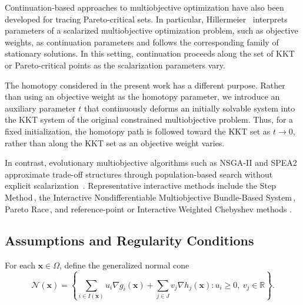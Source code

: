 \documentclass[11pt,pdflatex,sn-mathphys-ay]{sn-jnl}%
\theoremstyle{definition}
\theoremstyle{thmstyleone}%
\theoremstyle{thmstyletwo}%
\theoremstyle{thmstylethree}%
\newcommand{\add}[1]{\textcolor{revisionblue}{#1}}
\begin{document}
	\add{Continuation-based approaches to multiobjective optimization have also been developed for tracing Pareto-critical sets. In particular, Hillermeier~\cite{hillermeier2012nonlinear} interprets parameters of a scalarized multiobjective optimization problem, such as objective weights, as continuation parameters and follows the corresponding
		family of stationary solutions. In this setting, continuation proceeds
		along the set of KKT or Pareto-critical points as the scalarization
		parameters vary.}
	
	\add{The homotopy considered in the present work has a different purpose.
		Rather than using an objective weight as the homotopy parameter, we
		introduce an auxiliary parameter $t$ that continuously deforms an
		initially solvable system into the KKT system of the original
		constrained multiobjective problem. Thus, for a fixed initialization,
		the homotopy path is followed toward the KKT set as $t\to0$, rather
		than along the KKT set as an objective weight varies.} 
	
	In contrast, evolutionary multiobjective algorithms such as NSGA-II and SPEA2 approximate trade-off structures through population-based search without explicit scalarization~\cite{deb2002nsga2,zitzler2001spea2}. Representative interactive methods include the Step Method\,\cite{benayoun1971linear}, the Interactive Nondifferentiable Multiobjective Bundle-Based System\,\cite{miettinen2006synchronous}, Pareto Race\,\cite{korhonen2008pareto}, and reference-point or Interactive Weighted Chebyshev methods \cite{wierzbicki1980reference}. 
	
	\subsection{Assumptions and Regularity Conditions}
	For each $\bm x\in\Omega$, define the generalized normal cone\,\cite{rockafellar1998variational}
	\[
	\mathcal N(\bm{x})
	=
	\left\{
	\sum_{i\in I(\bm{x})}u_i\nabla g_i(\bm{x})
	+
	\sum_{j\in J}v_j\nabla h_j(\bm{x})
	:
	u_i\ge0,\ v_j\in\mathbb R
	\right\}.
	\]
	
\end{document}
